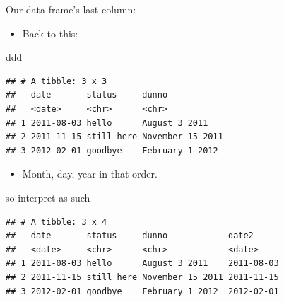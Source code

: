\documentclass[ignorenonframetext,]{beamer}
\newenvironment{Shaded}{\begin{snugshade}}{\end{snugshade}}
\newcommand{\DataTypeTok}[1]{\textcolor[rgb]{0.13,0.29,0.53}{#1}}
\newcommand{\KeywordTok}[1]{\textcolor[rgb]{0.13,0.29,0.53}{\textbf{#1}}}
\newcommand{\NormalTok}[1]{#1}
\newcommand{\OperatorTok}[1]{\textcolor[rgb]{0.81,0.36,0.00}{\textbf{#1}}}
\newcommand{\StringTok}[1]{\textcolor[rgb]{0.31,0.60,0.02}{#1}}
\providecommand{\tightlist}{%
  \setlength{\itemsep}{0pt}\setlength{\parskip}{0pt}}
\begin{document}
\begin{frame}[fragile]{Our data frame's last column:}
\protect\hypertarget{our-data-frames-last-column}{}

\begin{itemize}
\tightlist
\item
  Back to this:
\end{itemize}

\begin{Shaded}
\begin{Highlighting}[]
\NormalTok{ddd}
\end{Highlighting}
\end{Shaded}

\begin{verbatim}
## # A tibble: 3 x 3
##   date       status     dunno           
##   <date>     <chr>      <chr>           
## 1 2011-08-03 hello      August 3 2011   
## 2 2011-11-15 still here November 15 2011
## 3 2012-02-01 goodbye    February 1 2012
\end{verbatim}

\begin{itemize}
\tightlist
\item
  Month, day, year in that order.
\end{itemize}

\end{frame}

\begin{frame}[fragile]{so interpret as such}
\protect\hypertarget{so-interpret-as-such}{}

\begin{Shaded}
\end{Shaded}

\begin{verbatim}
## # A tibble: 3 x 4
##   date       status     dunno            date2     
##   <date>     <chr>      <chr>            <date>    
## 1 2011-08-03 hello      August 3 2011    2011-08-03
## 2 2011-11-15 still here November 15 2011 2011-11-15
## 3 2012-02-01 goodbye    February 1 2012  2012-02-01
\end{verbatim}

\end{frame}
\end{document}
